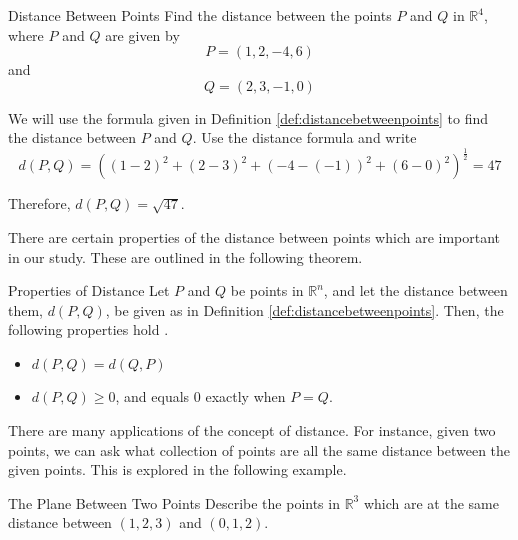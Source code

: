 \begin{example}{Distance Between Points}\label{exa:distancebetweenpoints}
Find the distance between the points $P$ and $Q$ in $\mathbb{R}^{4}$,
where $P$ and $Q$ are given by 
\begin{equation*}
P=\left( 1,2,-4,6\right)
\end{equation*}
and
\begin{equation*}
Q=\left( 2,3,-1,0\right)
\end{equation*}
\end{example}

\begin{solution}
We will use the formula given in Definition \ref{def:distancebetweenpoints} to find the distance between
$P$ and $Q$. 
Use the distance formula and write
\begin{equation*}
d(P,Q)= \left( \left( 1-2\right) ^{2}+\left( 2-3\right)
^{2}+\left( -4-\left( -1\right) \right) ^{2}+\left( 6-0\right)^{2}\right) ^{\frac{1}{2}} = 47
\end{equation*}

Therefore, $d( P,Q) =
\sqrt{47}.$

\end{solution}

There are certain properties of the distance between points which are important in our study.
These are outlined in the following theorem.

\begin{theorem}{Properties of Distance}\label{thm:distanceproperties}
Let $P$ and $Q$ be points in $\mathbb{R}^n$, and let the distance between them,
$d( P, Q)$, be given as in Definition \ref{def:distancebetweenpoints}. 
Then, the following properties hold .
\begin{itemize}
\item $ d( P, Q) = d( Q, P)  $
\item $ d( P, Q) \geq 0$, and equals 0 exactly when $P = Q.$
\end{itemize}
\end{theorem}

There are many applications of the concept of distance. For instance,
given two points, we can ask what collection of points are all the
same distance between the given points. This is explored in the
following example.

\begin{example}{The Plane Between Two Points}\label{exa:planebetweentwopoints}
Describe the points in $\mathbb{R}^3$ which are at the same distance between $\left(
1,2,3\right) $ and $\left( 0,1,2\right) .$
\end{example}

